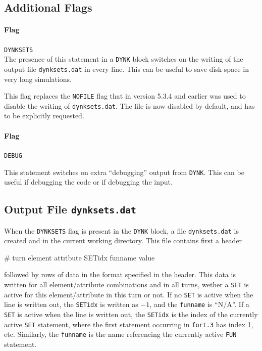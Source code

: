 \subsection{Additional Flags}

\paragraph{Flag} \texttt{DYNKSETS}\\

The presence of this statement in a \texttt{DYNK} block switches on the writing of the output file \texttt{dynksets.dat} in every line.
This can be useful to save disk space in very long simulations.

This flag replaces the \texttt{NOFILE} flag that in version 5.3.4 and earlier was used to disable the writing of \texttt{dynksets.dat}.
The file is now disabled by default, and has to be explicitly requested.

\paragraph{Flag} \texttt{DEBUG}

This statement switches on extra ``debugging'' output from \texttt{DYNK}.
This can be useful if debugging the code or if debugging the input.

\subsection{Output File \texttt{dynksets.dat}}

When the \texttt{DYNKSETS} flag is present in the \texttt{DYNK} block, a file \texttt{dynksets.dat} is created and in the current working directory.
This file contains first a header
\begin{cverbatim}
# turn element attribute SETidx funname value
\end{cverbatim}
followed by rows of data in the format specified in the header.
This data is written for all element/attribute combinations and in all turns, wether a \texttt{SET} is active for this element/attribute in this turn or not.
If no \texttt{SET} is active when the line is written out, the \texttt{SETidx} is written as $-1$, and the \texttt{funname} is ``N/A''.
If a \texttt{SET} is active when the line is written out, the \texttt{SETidx} is the index of the currently active \texttt{SET} statement, where the first statement occurring in \texttt{fort.3} has index 1, etc.
Similarly, the \texttt{funname} is the name referencing the currently active \texttt{FUN} statement.

